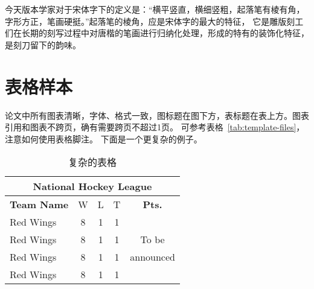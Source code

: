 
{\song
今天版本学家对于宋体字下的定义是：“横平竖直，横细竖粗，起落笔有棱有角，
字形方正，笔画硬挺。”起落笔的棱角，应是宋体字的最大的特征，
它是雕版刻工们在长期的刻写过程中对唐楷的笔画进行归纳化处理，形成的特有的装饰化特征，
是刻刀留下的韵味。}

\section{表格样本}
论文中所有图表清晰，字体、格式一致，图标题在图下方，表标题在表上方。图表引用和图表不跨页，确有需要跨页不超过1页。
可参考表格~\ref{tab:template-files}，注意如何使用表格脚注。
下面是一个更复杂的例子。
\begin{table}[htb]
\centering \caption{复杂的表格}\label{tab:tab1}
\begin{tabular}{|l||ccc||c|}\hline
\multicolumn{5}{|c|}{National Hockey League}\\ \hline \hline
\textbf{Team Name} & W & L & T & \textbf{Pts.} \\ \hline Red Wings &
8 & 1 & 1 & \\ \cline{1-4} Red Wings & 8 & 1 & 1 & To be\\
\cline{1-4} Red Wings & 8 & 1 & 1 & announced\\ \cline{1-4} Red
Wings & 8 & 1 & 1 & \\\hline
\end{tabular}
\end{table}

